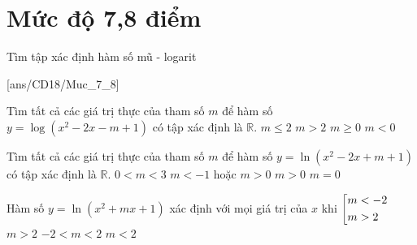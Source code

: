 \section{Mức độ 7,8 điểm}
\setcounter{ex}{0}
\setcounter{dang}{0}
\begin{dang}
    {Tìm tập xác định hàm số mũ - logarit}
\end{dang}
[ans/CD18/Muc_7_8]
\begin{ex}%
    [Mã 105 2017]
    Tìm tất cả các giá trị thực của tham số $m$ để hàm số $y=\log\left(x^2-2x-m+1\right)$ có tập xác định là $\mathbb{R}$.
    \choice
    {$m\le 2$}
    {$m>2$}
    {$m\ge 0$}
    {\True $m<0$}
\end{ex}

\begin{ex}%
    [Mã 104 2017]
    Tìm tất cả các giá trị thực của tham số $m$ để hàm số $y=\ln\left(x^2-2x+m+1\right)$ có tập xác định là $\mathbb{R}$.
    \choice
    {$0<m<3$}
    {$m<-1$ hoặc $m>0$}
    {\True $m>0$}
    {$m=0$}
\end{ex}

\begin{ex}%
    Hàm số $y=\ln\left(x^2+mx+1\right)$ xác định với mọi giá trị của $x$ khi
    \choice
    {$\left[\begin{aligned}& m<-2\\& m>2\end{aligned}\right.$}
    {$m>2$}
    {\True $-2<m<2$}
    {$m<2$}
\end{ex}

